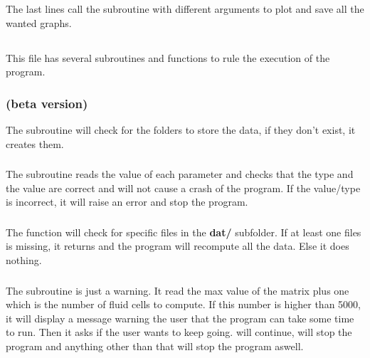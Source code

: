 The last lines call the subroutine  with different arguments
to plot and save all the wanted graphs.

\subsection{}
This file has several subroutines and functions to rule the execution of the
program.

\subsubsection{\textcolor{func}{} (beta version)}
The subroutine \textcolor{func}{} will check for the
folders to store the data, if they don't exist, it creates them.

\subsubsection{\textcolor{func}{}}
The subroutine \textcolor{func}{} reads the value of each
parameter and checks that the type and the value are correct and will not cause
a crash of the program. If the value/type is incorrect, it will raise an error
and stop the program.

\subsubsection{\textcolor{func}{}}
The function \textcolor{func}{} will check for specific
files in the \textbf{dat/} subfolder. If at least one files is missing, it
returns  and the program will recompute all the data. Else it does
nothing.

\subsubsection{\textcolor{func}{}}
The subroutine \textcolor{func}{} is just a warning. It read the max value of
the matrix  plus one which is the number of fluid cells to compute.
If this number is higher than 5000, it will display a message warning the user
that the program can take some time to run. Then it asks if the user wants to
keep going.  will continue,  will stop the program and
anything other than that will stop the program aswell.

